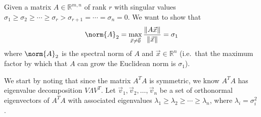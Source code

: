 
Given a matrix $A \in \mathbb{R}^{m,n}$ of rank $r$ with singular values $\sigma_{1} \geq \sigma_{2} \geq \cdots \geq \sigma_{r} > \sigma_{r+1} = \cdots = \sigma_{n} = 0$. 
We want to show that 
\begin{equation}
\norm{A}_{2} = \max_{\vec{x} \neq \vec{0}} \frac{\|A\vec{x}\|}{\|\vec{x}\|} = \sigma_{1}
\end{equation} where $\norm{A}_{2}$ is the spectral norm of $A$ and $\vec{x} \in \mathbb{R}^{n}$ (i.e.~that the maximum factor by which that $A$ can grow the Euclidean norm is $\sigma_1$). 

We start by noting that since the matrix $A^{T}A$ is symmetric, we know $A^{T}A$ has eigenvalue decomposition $V \Lambda V^{T}.$ Let $\vec{v}_{1}, \vec{v}_{2}, \ldots, \vec{v}_{n}$ be a set of orthonormal eigenvectors of $A^{T}A$ with associated eigenvalues $\lambda_{1} \geq \lambda_{2} \geq \cdots \geq \lambda_{n}$, where $\lambda_i = \sigma_i^2$.


